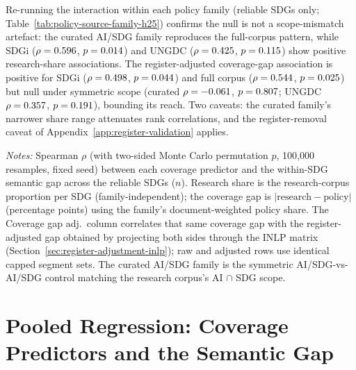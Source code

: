\documentclass[12pt,a4paper]{article}
\let\OldSection\section
\renewcommand{\section}{\clearpage\FloatBarrier\OldSection}
\begin{document}
  Re-running the interaction within each policy family (reliable SDGs only; Table~\ref{tab:policy-source-family-h25}) confirms the null is not a scope-mismatch artefact: the curated AI/SDG family reproduces the full-corpus pattern, while SDGi ($\rho = 0.596$, $p = 0.014$) and UNGDC ($\rho = 0.425$, $p = 0.115$) show positive research-share associations. The register-adjusted coverage-gap association is positive for SDGi ($\rho = 0.498$, $p = 0.044$) and full corpus ($\rho = 0.544$, $p = 0.025$) but null under symmetric scope (curated $\rho = -0.061$, $p = 0.807$; UNGDC $\rho = 0.357$, $p = 0.191$), bounding its reach. Two caveats: the curated family's narrower share range attenuates rank correlations, and the register-removal caveat of Appendix~\ref{app:register-validation} applies.

\begin{table}[ht]
\centering
\caption{Per-family interaction test: coverage predictors vs the within-SDG semantic gap, raw and register-adjusted.}
\label{tab:policy-source-family-h25}
\resizebox{\textwidth}{!}{}
\par\smallskip\footnotesize\emph{Notes:} Spearman $\rho$ (with two-sided Monte Carlo permutation $p$, 100{,}000 resamples, fixed seed) between each coverage predictor and the within-SDG semantic gap across the reliable SDGs ($n$). Research share is the research-corpus proportion per SDG (family-independent); the coverage gap is $|\text{research}-\text{policy}|$ (percentage points) using the family's document-weighted policy share. The Coverage gap adj.\ column correlates that same coverage gap with the register-adjusted gap obtained by projecting both sides through the INLP matrix (Section~\ref{sec:register-adjustment-inlp}); raw and adjusted rows use identical capped segment sets. The curated AI/SDG family is the symmetric AI/SDG-vs-AI/SDG control matching the research corpus's AI $\cap$ SDG scope.\par
\end{table}

\section{Pooled Regression: Coverage Predictors and the Semantic Gap}
\label{app:regression}
\end{document}
